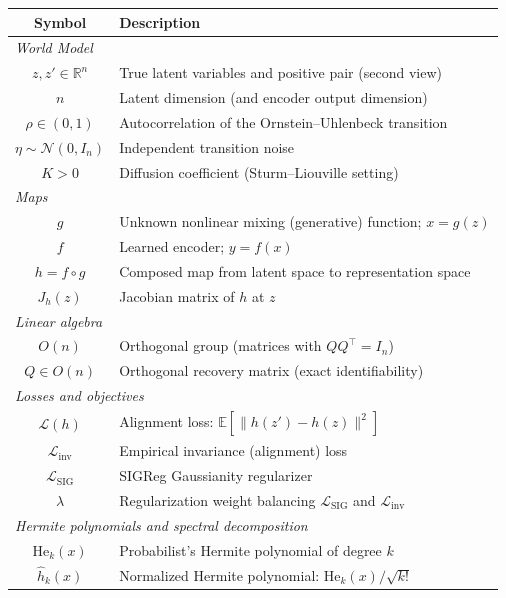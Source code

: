  
{
\begin{center}
\renewcommand{\arraystretch}{1.15}
\begin{tabular}{cl}
\toprule
\textbf{Symbol} & \textbf{Description} \\
\midrule
\multicolumn{2}{l}{\textit{World Model}} \\
$z, z' \in \mathbb{R}^n$ & True latent variables and positive pair (second view) \\
$n$ & Latent dimension (and encoder output dimension) \\
$\rho \in (0,1)$ & Autocorrelation of the Ornstein--Uhlenbeck transition \\
$\eta \sim \mathcal{N}(0, I_n)$ & Independent transition noise \\
$K > 0$ & Diffusion coefficient (Sturm--Liouville setting) \\
\midrule
\multicolumn{2}{l}{\textit{Maps}} \\
$g$ & Unknown nonlinear mixing (generative) function; $x = g(z)$ \\
$f$ & Learned encoder; $y = f(x)$ \\
$h = f \circ g$ & Composed map from latent space to representation space \\
$J_h(z)$ & Jacobian matrix of $h$ at $z$ \\
\midrule
\multicolumn{2}{l}{\textit{Linear algebra}} \\
$O(n)$ & Orthogonal group (matrices with $QQ^\top = I_n$) \\
$Q \in O(n)$ & Orthogonal recovery matrix (exact identifiability) \\
\midrule
\multicolumn{2}{l}{\textit{Losses and objectives}} \\
$\mathcal{L}(h)$ & Alignment loss: $\mathbb{E}[\|h(z') - h(z)\|^2]$ \\
$\mathcal{L}_{\mathrm{inv}}$ & Empirical invariance (alignment) loss \\
$\mathcal{L}_{\mathrm{SIG}}$ & SIGReg Gaussianity regularizer \\
$\lambda$ & Regularization weight balancing $\mathcal{L}_{\mathrm{SIG}}$ and $\mathcal{L}_{\mathrm{inv}}$ \\
\midrule
\multicolumn{2}{l}{\textit{Hermite polynomials and spectral decomposition}} \\
$\mathrm{He}_k(x)$ & Probabilist's Hermite polynomial of degree $k$ \\
$\hat{h}_k(x)$ & Normalized Hermite polynomial: $\mathrm{He}_k(x)/\sqrt{k!}$ \\

\end{tabular}
\end{center}}
